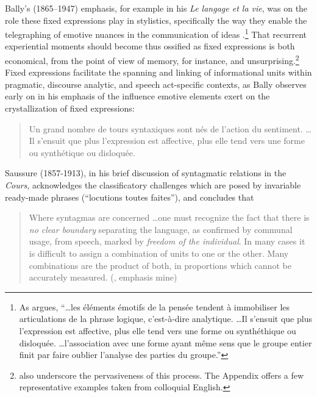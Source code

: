 \documentclass[english,output=paper,colorlinks,citecolor=brown]{../langscibook}
\begin{document}
Bally's (1865--1947) emphasis, for example in his \textit{Le langage et la vie}, was on the role these fixed expressions play in stylistics, specifically the way they enable the telegraphing of emotive nuances in the communication of ideas \citep[141]{Bally1952}.\footnote{As \citet[68]{Bally1952} argues, “…les éléments émotifs de la pensée tendent à immobiliser les articulations de la phrase logique, c’est-à-dire analytique. …Il s’ensuit que plus l’expression est affective, plus elle tend vers une forme ou synthéthique ou disloquée. …l'association avec une forme ayant même sens que le groupe entier finit par faire oublier l'analyse des parties du groupe.”} That recurrent experiential moments should become thus ossified as fixed expressions is both economical, from the point of view of memory, for instance, and unsurprising.\footnote{\citet[191]{RichardsSchmidt1983} also underscore the pervasiveness of this process. The Appendix offers a few representative examples taken from colloquial English.} Fixed expressions facilitate the spanning and linking of informational units within pragmatic, discourse analytic, and speech act-specific contexts, as Bally observes early on in his emphasis of the influence emotive elements exert on the crystallization of fixed expressions: 

\begin{quote}
    Un grand nombre de tours syntaxiques sont nés de l’action du sentiment. …Il s’ensuit que plus l’expression est affective, plus elle tend vers une forme ou synthétique ou disloquée. \citep[68]{Bally1952}
\end{quote}

Saussure (1857-1913), in his brief discussion of syntagmatic relations in the \textit{Cours}, acknowledges the classificatory challenges which are posed by invariable ready-made phrases (“locutions toutes faites”), and concludes that

\begin{quote}
    Where syntagmas are concerned …one must recognize the fact that there is \textit{no clear boundary} separating the language, as confirmed by communal usage, from speech, marked by \textit{freedom of the individual}. In many cases it is difficult to assign a combination of units to one or the other. Many combinations are the product of both, in proportions which cannot be accurately measured. (\citealt[123]{Saussure1986}, emphasis mine)
\end{quote}
\end{document}
